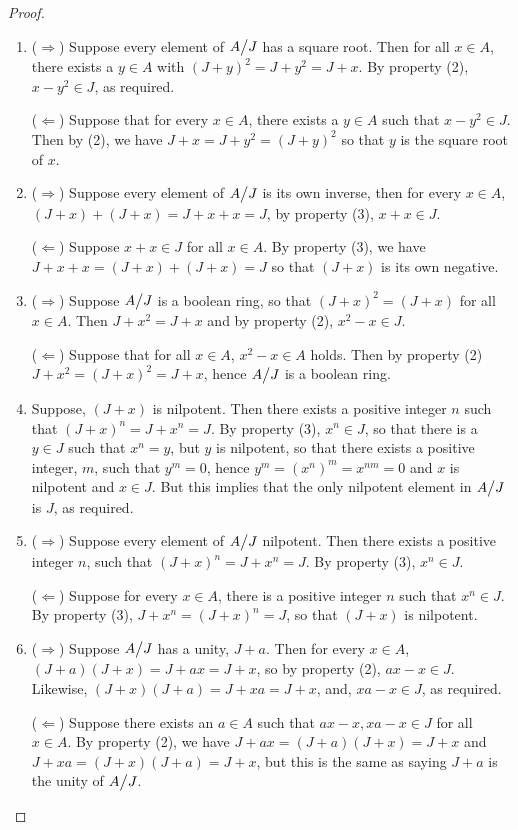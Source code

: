 \begin{proof}
 \begin{enumerate}
     \item ($\Rightarrow$) Suppose every element of ${\textstyle A}\big/{\textstyle J}$ has a square root. Then for all $x\in A$, there exists a $y\in A$ with $(J+y)^{2}=J+y^{2}=J+x$. By property (2), $x-y^{2}\in J$, as required.

     ($\Leftarrow$) Suppose that for every $x\in A$, there exists a $y\in A$ such that $x-y^{2}\in J$. Then by (2), we have $J+x=J+y^{2}=(J+y)^{2}$ so that $y$ is the square root of $x$.
     \item ($\Rightarrow$) Suppose every element of ${\textstyle A}\big/{\textstyle J}$ is its own inverse, then for every $x\in A$, $(J+x)+(J+x)=J+x+x=J$, by property (3), $x+x\in J$.

     ($\Leftarrow$) Suppose $x+x\in J$ for all $x\in A$. By property (3), we have $J+x+x=(J+x)+(J+x)=J$ so that $(J+x)$ is its own negative.
     \item ($\Rightarrow$) Suppose ${\textstyle A}\big/{\textstyle J}$ is a boolean ring, so that $(J+x)^{2}=(J+x)$ for all $x\in A$. Then $J+x^{2}=J+x$ and by property (2), $x^{2}-x\in J$.

     ($\Leftarrow$) Suppose that for all $x\in A$, $x^{2}-x\in A$ holds. Then by property (2) $J+x^{2}=(J+x)^{2}=J+x$, hence ${\textstyle A}\big/{\textstyle J}$ is a boolean ring.
     \item Suppose, $(J+x)$ is nilpotent. Then there exists a positive integer $n$ such that $(J+x)^{n}=J+x^{n}=J$. By property (3), $x^{n}\in J$, so that there is a $y\in J$ such that $x^{n}=y$, but $y$ is nilpotent, so that there exists a positive integer, $m$, such that $y^{m}=0$, hence $y^{m}=(x^{n})^{m}=x^{nm}=0$ and $x$ is nilpotent and $x\in J$. But this implies that the only nilpotent element in ${\textstyle A}\big/{\textstyle J}$ is $J$, as required.
     \item ($\Rightarrow$) Suppose every element of ${\textstyle A}\big/{\textstyle J}$ nilpotent. Then there exists a positive integer $n$, such that $(J+x)^{n}=J+x^{n}=J$. By property (3), $x^{n}\in J$.

     ($\Leftarrow$) Suppose for every $x\in A$, there is a positive integer $n$ such that $x^{n}\in J$. By property (3), $J+x^{n}=(J+x)^{n}=J$, so that $(J+x)$ is nilpotent.
     \item ($\Rightarrow$) Suppose ${\textstyle A}\big/{\textstyle J}$ has a unity, $J+a$. Then for every $x\in A$, $(J+a)(J+x)=J+ax=J+x$, so by property (2), $ax-x\in J$. Likewise, $(J+x)(J+a)=J+xa=J+x$, and, $xa-x\in J$, as required.

     ($\Leftarrow$) Suppose there exists an $a\in A$ such that $ax-x, xa-x\in J$ for all $x\in A$. By property (2), we have $J+ax=(J+a)(J+x)=J+x$ and $J+xa=(J+x)(J+a)=J+x$, but this is the same as saying $J+a$ is the unity of ${\textstyle A}\big/{\textstyle J}$.
 \end{enumerate}
\end{proof}


